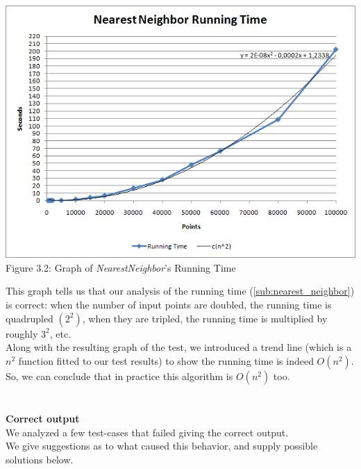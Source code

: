     \begin{center}
      \includegraphics[scale = 0.5]{1NearestNeighbor/nnRuntimegraph.png}\\
      Figure 3.2: Graph of \textit{NearestNeighbor}'s Running Time
      \label{fig:nn_runningtime}
    \end{center}
    This graph tells us that our analysis of the running time (\ref{sub:nearest_neighbor}) is correct: when the number of input points are doubled, the running time is quadrupled $(2^2)$, when they are tripled, the running time is multiplied by roughly $3^2$, etc.\\
    Along with the resulting graph of the test, we introduced a trend line (which is a $n^2$ function fitted to our test results) to show the running time is indeed $O(n^2)$.\\
    So, we can conclude that in practice this algorithm is $O(n^2)$ too.\\ \\ \\
    \textbf{Correct output}\\
    We analyzed a few test-cases that failed giving the correct output.\\
    We give suggestions as to what caused this behavior, and supply possible solutions below.\\

